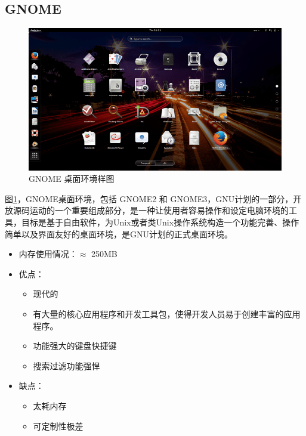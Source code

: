 \documentclass[doctor,openright,twoside]{sjtuthesis}
\providecommand{\tightlist}{%
    \setlength{\itemsep}{0pt}\setlength{\parskip}{0pt}}
\theoremstyle{plain}
\theoremstyle{definition}
\theoremstyle{remark}
\theoremstyle{ocrenumbox}
\theoremstyle{plain}
\begin{document}
\hypertarget{gnome}{%
\subsection{GNOME}\label{gnome}}

\begin{figure}
\includegraphics{de-GNOME} \caption[GNOME 桌面环境样图]{GNOME 桌面环境样图}\label{fig:de-GNOME}
\end{figure}

图\ref{fig:de-GNOME}，GNOME桌面环境，包括 GNOME2 和
GNOME3，GNU计划的一部分，开放源码运动的一个重要组成部分，是一种让使用者容易操作和设定电脑环境的工具，目标是基于自由软件，为Unix或者类Unix操作系统构造一个功能完善、操作简单以及界面友好的桌面环境，是GNU计划的正式桌面环境。

\begin{itemize}
\tightlist
\item
  内存使用情况：\(\approx\) 250MB
\item
  优点：

  \begin{itemize}
  \tightlist
  \item
    现代的
  \item
    有大量的核心应用程序和开发工具包，使得开发人员易于创建丰富的应用程序。
  \item
    功能强大的键盘快捷键
  \item
    搜索过滤功能强悍
  \end{itemize}
\item
  缺点：

  \begin{itemize}
  \tightlist
  \item
    太耗内存
  \item
    可定制性极差
  \end{itemize}
\end{itemize}
\end{document}

